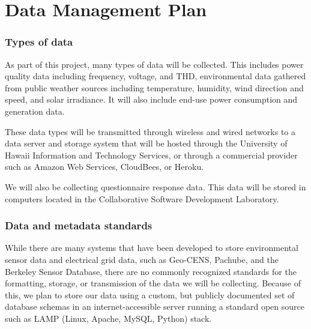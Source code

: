 
\section*{Data Management Plan}

\subsubsection*{Types of data}

As part of this project, many types of data will be collected. This includes power quality data including frequency, voltage, and THD, environmental data gathered from public weather sources including temperature, humidity, wind direction and speed, and solar irradiance. It will also include end-use power consumption and generation data.

These data types will be transmitted through wireless and wired networks to a data server and storage system that will be hosted through the University of Hawaii Information and Technology Services, or through a commercial provider such as Amazon Web Services, CloudBees, or Heroku.

We will also be collecting questionnaire response data.  This data will be stored in computers located in the Collaborative Software Development Laboratory.

\subsubsection*{Data and metadata standards}

While there are many systems that have been developed to store environmental sensor data and electrical grid data, such as Geo-CENS, Pachube, and the Berkeley Sensor Database, there are no commonly recognized standards for the formatting, storage, or transmission of the data we will be collecting. Because of this, we plan to store our data using a custom, but publicly documented set of database schemas in an internet-accessible server running a standard open source such as LAMP (Linux, Apache, MySQL, Python) stack. 

